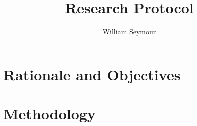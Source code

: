 \documentclass{article}
\author{William Seymour}
\title{Research Protocol}
\begin{document}
	\maketitle
\section{Rationale and Objectives}
\section{Methodology}
\end{document}
